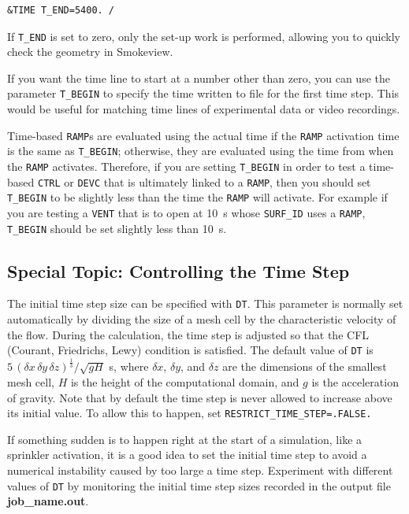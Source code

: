 \documentclass[11pt]{book}
\newcommand{\ct}{\tt\small}
\newcommand{\dx}{\delta x}
\newcommand{\dy}{\delta y}
\newcommand{\dz}{\delta z}
\newcommand{\ot}{\frac{1}{3}}
\begin{document}
\footnotesize
\begin{verbatim}
&TIME T_END=5400. /
\end{verbatim}

\normalsize
\noindent If {\ct T\_END} is set to zero, only the set-up work is performed,
allowing you to quickly check the geometry in Smokeview.

If you want the time line to start at a number other than zero, you can use the parameter
{\ct T\_BEGIN} to specify the time written to file for the first time step.
This would be useful for matching time lines of experimental data or video recordings.

\begin{warning}
Time-based {\ct RAMP}s are evaluated using the actual time if the {\ct RAMP} activation time is the same as
{\ct T\_BEGIN}; otherwise, they are evaluated using the time from when the {\ct RAMP} activates.  Therefore, if you are
setting {\ct T\_BEGIN} in order to test a time-based {\ct CTRL} or {\ct DEVC} that is ultimately
linked to a {\ct RAMP}, then you should set {\ct T\_BEGIN} to be slightly less than the time the {\ct RAMP} will activate.
For example if you are testing a {\ct VENT} that is to open at 10~s whose {\ct SURF\_ID} uses a {\ct RAMP},
{\ct T\_BEGIN} should be set slightly less than 10~s.
\end{warning}

\subsection{Special Topic: Controlling the Time Step}
\label{info:TIME_Control}

The initial time step size can be specified with
{\ct DT}. This parameter is normally set automatically by dividing the size of a mesh cell by the
characteristic velocity of the flow.
During the calculation, the time step is adjusted so that the CFL (Courant, Friedrichs, Lewy) condition is
satisfied. The default value of {\ct DT} is $5 \, (\dx \, \dy \, \dz)^\ot/\sqrt{gH}$ s, where
$\dx$, $\dy$, and $\dz$ are the dimensions of the smallest mesh
cell, $H$ is the height of the computational domain, and $g$ is the acceleration of gravity. Note that by default the
time step is never allowed to increase above its initial value. To allow this to happen, set
{\ct RESTRICT\_TIME\_STEP=.FALSE.}

\begin{warning}
If something sudden is to happen right at the start of a simulation,
like a sprinkler activation, it is a good idea to set the initial time step
to avoid a numerical instability caused by too large a time step.
Experiment with different values of {\ct DT} by monitoring the initial time step sizes
recorded in the output file {\bf job\_name.out}.
\end{warning}
\end{document}
